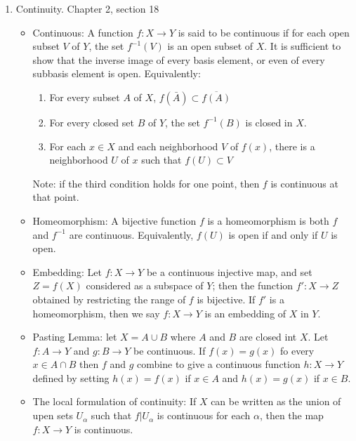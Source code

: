 \documentclass[12pt,letterpaper]{article}
\begin{document}
\begin{enumerate}
\begin{itemize}
\begin{itemize}
    \end{itemize}
  \end{itemize}
  \item \label{sec:continuity} Continuity. Chapter 2, section 18
  \begin{itemize}
    \item \label{dfn:continuous} Continuous: A function $f: X\rightarrow Y$ is said to be continuous if for each open subset $V$ of $Y$, the set $f^{-1}(V)$ is an open subset of $X$. It is sufficient to show that the inverse image of every basis element, or even of every subbasis element is open.
    Equivalently:
    \begin{enumerate} %
      \item \label{dfn:continuous2} For every subset $A$ of $X$, $f(\bar{A}) \subset \overline{f(A)}$
      \item \label{dfn:continuous3} For every closed set $B$ of $Y$, the set $f^{-1}(B)$ is closed in $X$.
      \item \label{dfn:continuous4} For each $x\in X$ and each neighborhood $V$ of $f(x)$, there is a neighborhood $U$ of $x$ such that $f(U) \subset V$
    \end{enumerate}
    Note: if the third condition holds for one point, then $f$ is continuous at that point.
    \item \label{dfn:homeomorphism} Homeomorphism: A bijective function $f$ is a homeomorphism is both $f$ and $f^{-1}$ are continuous.
    Equivalently, $f(U)$ is open if and only if $U$ is open.
    \item \label{dfn:embedding} Embedding: Let $f: X\rightarrow Y$ be a continuous injective map, and set $Z=f(X)$ considered as a subspace of $Y$; then the function $f': X\rightarrow Z$ obtained by restricting the range of $f$ is bijective. If $f'$ is a homeomorphism, then we say $f:X\rightarrow Y$ is an embedding of $X$ in $Y$.
    \item \label{thm:PastingLemma} Pasting Lemma: let $X=A\cup B$ where $A$ and $B$ are closed int $X$. Let $f: A\rightarrow Y$ and $g: B\rightarrow Y$ be continuous. If $f(x)=g(x)$ fo every $x\in A\cap B$ then $f$ and $g$ combine to give a continuous function $h: X\rightarrow Y$ defined by setting $h(x) = f(x)$ if $x\in A$ and $h(x) = g(x)$ if $x\in B$.
    \item \label{thm:LocalFormulationContinuity} The local formulation of continuity: If $X$ can be written as the union of upen sets $U_\alpha$ such that $f|U_\alpha$ is continuous for each $\alpha$, then the map $f: X\rightarrow Y$ is continuous.

\end{itemize}
\end{enumerate}
\end{document}
